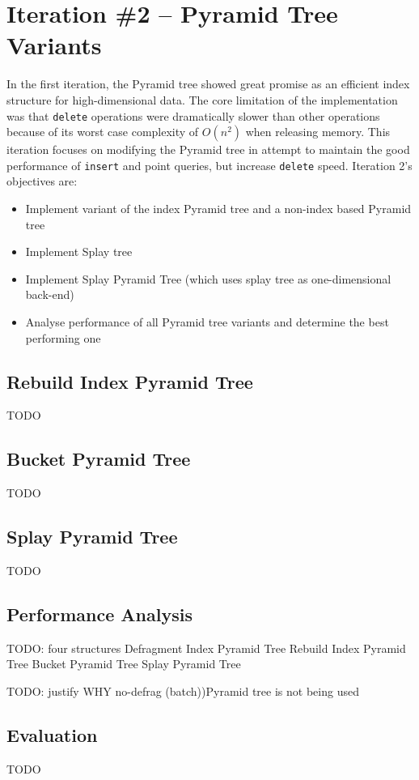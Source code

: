 \section{Iteration \#2 -- Pyramid Tree Variants}

In the first iteration, the Pyramid tree showed great promise as an efficient index structure for high-dimensional data. The core limitation of the implementation was that \texttt{delete} operations were dramatically slower than other operations because of its worst case complexity of $O(n^2)$ when releasing memory. This iteration focuses on modifying the Pyramid tree in attempt to maintain the good performance of \texttt{insert} and point queries, but increase \texttt{delete} speed. Iteration 2's objectives are:
\begin{itemize}
	\item Implement variant of the index Pyramid tree and a non-index based Pyramid tree
	\item Implement Splay tree
	\item Implement Splay Pyramid Tree (which uses splay tree as one-dimensional back-end)
	\item Analyse performance of all Pyramid tree variants and determine the best performing one
\end{itemize}

\subsection{Rebuild Index Pyramid Tree}

TODO

\subsection{Bucket Pyramid Tree}

TODO

\subsection{Splay Pyramid Tree}

TODO

\subsection{Performance Analysis}

TODO: four structures
	Defragment Index Pyramid Tree
	Rebuild Index Pyramid Tree
	Bucket Pyramid Tree
	Splay Pyramid Tree

TODO: justify WHY no-defrag (batch))Pyramid tree is not being used

\subsection{Evaluation}

TODO
